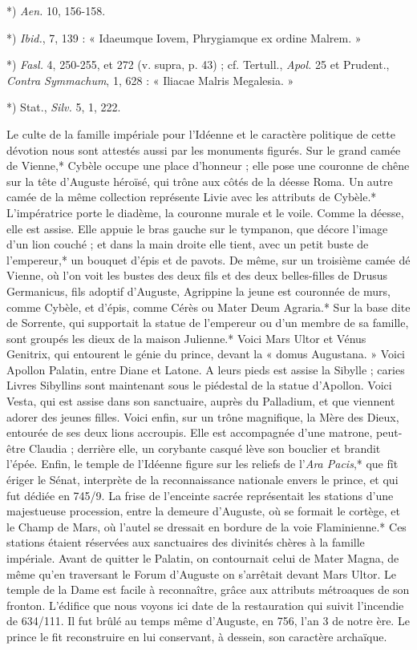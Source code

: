 \documentclass[a4paper, 11pt, oneside, polutonikogreek, french]{article}
\begin{document}
*) \emph{Aen.} 10, 156-158.

*) \emph{Ibid.}, 7, 139 : « Idaeumque Iovem, Phrygiamque ex ordine Malrem. »

*) \emph{Fasl.} 4, 250-255, et 272 (v. supra, p. 43) ; cf. Tertull., \emph{Apol.} 25 et Prudent., \emph{Contra Symmachum}, 1, 628 : « Iliacae Malris Megalesia. »

*) Stat., \emph{Silv.} 5, 1, 222.

Le culte de la famille impériale pour l'Idéenne et le caractère politique de cette dévotion nous sont attestés aussi par les monuments figurés. Sur le grand camée de Vienne,* Cybèle occupe une place d'honneur ; elle pose une couronne de chêne sur la tête d'Auguste héroïsé, qui trône aux côtés de la déesse Roma. Un autre camée de la même collection représente Livie avec les attributs de Cybèle.* L'impératrice porte le diadème, la couronne murale et le voile. Comme la déesse, elle est assise. Elle appuie le bras gauche sur le tympanon, que décore l'image d'un lion couché ; et dans la main droite elle tient, avec un petit buste de l'empereur,* un bouquet d'épis et de pavots. De même, sur un troisième camée dé Vienne, où l'on voit les bustes des deux fils et des deux belles-filles de Drusus Germanicus, fils adoptif d'Auguste, Agrippine la jeune est couronnée de murs, comme Cybèle, et d'épis, comme Cérès ou Mater Deum Agraria.* Sur la base dite de Sorrente, qui supportait la statue de l'empereur ou d'un membre de sa famille, sont groupés les dieux de la maison Julienne.* Voici Mars Ultor et Vénus Genitrix, qui entourent le génie du prince, devant la « domus Augustana. » Voici Apollon Palatin, entre Diane et Latone. A leurs pieds est assise la Sibylle ; caries Livres Sibyllins sont maintenant sous le piédestal de la statue d'Apollon. Voici Vesta, qui est assise dans son sanctuaire, auprès du Palladium, et que viennent adorer des jeunes filles. Voici enfin, sur un trône magnifique, la Mère des Dieux, entourée de ses deux lions accroupis. Elle est accompagnée d'une matrone, peut-être Claudia ; derrière elle, un corybante casqué lève son bouclier et brandit l'épée. Enfin, le temple de l'Idéenne figure sur les reliefs de l'\emph{Ara Pacis},* que fît ériger le Sénat, interprète de la reconnaissance nationale envers le prince, et qui fut dédiée en 745/9. La frise de l'enceinte sacrée représentait les stations d'une majestueuse procession, entre la demeure d'Auguste, où se formait le cortège, et le Champ de Mars, où l'autel se dressait en bordure de la voie Flaminienne.* Ces stations étaient réservées aux sanctuaires des divinités chères à la famille impériale. Avant de quitter le Palatin, on contournait celui de Mater Magna, de même qu'en traversant le Forum d'Auguste on s'arrêtait devant Mars Ultor. Le temple de la Dame est facile à reconnaître, grâce aux attributs métroaques de son fronton. L'édifice que nous voyons ici date de la restauration qui suivit l'incendie de 634/111. Il fut brûlé au temps même d'Auguste, en 756, l'an 3 de notre ère. Le prince le fit reconstruire en lui conservant, à dessein, son caractère archaïque.
\end{document}
